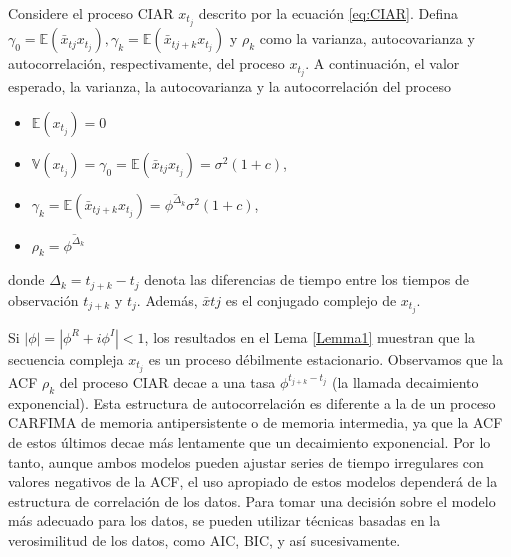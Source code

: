 \begin{lemma}
	Considere el proceso CIAR $x_{t_{j}}$ descrito por la ecuación \ref{eq:CIAR}. Defina $\gamma_{0}=\mathbb{E}\left(\bar{x}_{t{j}} x_{t_{j}}\right), \gamma_{k}=\mathbb{E}\left(\bar{x}_{t{j+k}} x_{t_{j}}\right)$ 
	y $\rho_{k}$ como la varianza, autocovarianza y autocorrelación, respectivamente, del proceso $x_{t_{j}}$. A continuación, el valor esperado, la varianza, la autocovarianza y la autocorrelación del proceso 
	\begin{itemize}
		\item $\mathbb{E}\left(x_{t_{j}}\right) = 0$
		\item $\mathbb{V}\left(x_{t_{j}}\right)=\gamma_{0}=\mathbb{E}\left(\bar{x}_{t{j}} x_{t_{j}}\right)=\sigma^{2}(1+c)$,
		\item $\gamma_{k}=\mathbb{E}\left(\bar{x}_{t{j+k}} x_{t_{j}}\right)=\overline{\phi^{\Delta_{k}}} \sigma^{2}(1+c)$,
		\item $\rho_{k}=\overline{\phi^{\Delta_{k}}}$
	\end{itemize}
	donde $\Delta_{k}=t_{j+k}-t_{j}$ denota las diferencias de tiempo entre los tiempos de observación $t_{j+k}$ y $t_{j}$. Además, 
	$\bar{x}{t{j}}$ es el conjugado complejo de $x_{t_{j}}$.
	\label{Lemma1}
\end{lemma}
 
 Si $|\phi|=\left|\phi^{R}+i \phi^{I}\right|<1$, los resultados en el Lema \ref{Lemma1} muestran que la secuencia compleja $x_{t_{j}}$ es un proceso débilmente estacionario. 
 Observamos que la ACF $\rho_{k}$ del proceso CIAR decae a una tasa $\phi^{t_{j+k}-t_{j}}$ (la llamada decaimiento exponencial). Esta estructura de autocorrelación es diferente a la de un proceso CARFIMA de memoria antipersistente o de memoria intermedia, ya que la ACF de estos últimos decae más lentamente que un decaimiento exponencial. Por lo tanto, aunque ambos modelos pueden ajustar series de tiempo irregulares con valores negativos de la ACF, el uso apropiado de estos modelos dependerá de la estructura de correlación de los datos. Para tomar una decisión sobre el modelo más adecuado para los datos, se pueden utilizar técnicas basadas en la verosimilitud de los datos, como AIC, BIC, y así sucesivamente.
